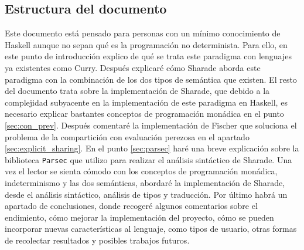 \documentclass[class=article, crop=false]{standalone}
\begin{document}
\subsection{Estructura del documento}
Este documento está pensado para personas con un mínimo conocimiento de Haskell aunque no
sepan qué es la programación no determinista. Para ello, en este punto de introducción
explico de qué se trata este paradigma con lenguajes ya existentes como Curry. Después
explicaré cómo Sharade aborda este paradigma con la combinación de los dos tipos de semántica
que existen. El resto del documento trata sobre la implementación de Sharade, que debido a la
complejidad subyacente en la implementación de este paradigma en Haskell, es necesario
explicar bastantes conceptos de programación monádica en el punto \ref{sec:con_prev}. Después
comentaré la implementación de Fischer que soluciona el problema de la compartición con
evaluación perezosa en el apartado \ref{sec:explicit_sharing}.
En el punto \ref{sec:parsec} haré una breve explicación sobre la biblioteca \verb`Parsec` que
utilizo para realizar el análisis sintáctico de Sharade. Una vez el lector se sienta cómodo
con los conceptos de programación monádica, indeterminismo y las dos semánticas, abordaré la
implementación de Sharade, desde el análisis sintáctico, análisis de tipos y traducción. Por
último habrá un apartado de conclusiones, donde recogeré algunos comentarios sobre el 
endimiento, cómo mejorar la implementación del proyecto, cómo se pueden incorporar nuevas
características al lenguaje, como tipos de usuario, otras formas de recolectar resultados y
posibles trabajos futuros.
\end{document}
